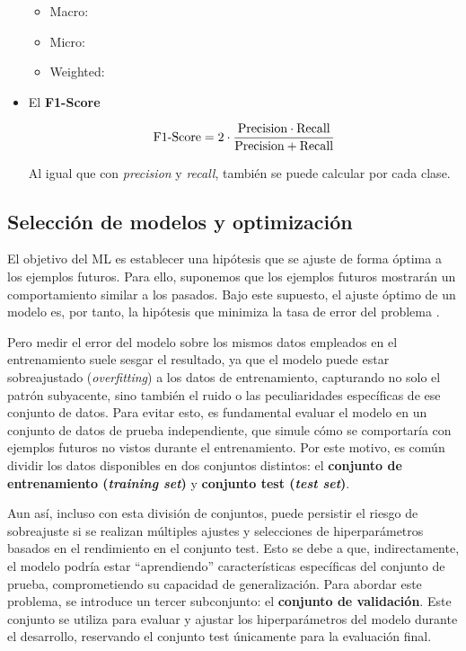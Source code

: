 \begin{itemize}
    \begin{itemize}
        \item Macro:
        \item Micro:
        \item Weighted: 
    \end{itemize}
    

    \item El \textbf{F1-Score} 

    $$
    \textnormal{F1-Score} = 2 \cdot \frac{\textnormal{Precision} \cdot \textnormal{Recall}}{\textnormal{Precision} + \textnormal{Recall}}
    $$

    Al igual que con \textit{precision} y \textit{recall}, también se puede calcular por cada clase. 


\end{itemize}


\subsection{Selección de modelos y optimización}

El objetivo del ML es establecer una hipótesis que se ajuste de forma óptima a los ejemplos futuros. Para 
ello, suponemos que los ejemplos futuros mostrarán un comportamiento similar a los pasados. Bajo este 
supuesto, el ajuste óptimo de un modelo es, por tanto, la hipótesis que minimiza la tasa de error del 
problema \cite{rusell2021}. 

Pero medir el error del modelo sobre los mismos datos empleados en el entrenamiento suele sesgar el resultado, 
ya que el modelo puede estar sobreajustado (\textit{overfitting}) a los datos de entrenamiento, capturando no 
solo el patrón subyacente, sino también el ruido o las peculiaridades específicas de ese conjunto de datos.
Para evitar esto, es fundamental evaluar el modelo en un conjunto de datos de prueba independiente, que simule 
cómo se comportaría con ejemplos futuros no vistos durante el entrenamiento. Por este motivo, es común dividir 
los datos disponibles en dos conjuntos distintos: el \textbf{conjunto de entrenamiento (\textit{training 
set})} y \textbf{conjunto test (\textit{test set})}.

Aun así, incluso con esta división de conjuntos, puede persistir el riesgo de sobreajuste si se realizan 
múltiples ajustes y selecciones de hiperparámetros basados en el rendimiento en el conjunto test.
Esto se debe a que, indirectamente, el modelo podría estar ``aprendiendo'' características específicas del 
conjunto de prueba, comprometiendo su capacidad de generalización. Para abordar este problema, se introduce 
un tercer subconjunto: el \textbf{conjunto de validación}. Este conjunto se utiliza para evaluar y ajustar 
los hiperparámetros del modelo durante el desarrollo, reservando el conjunto test únicamente para la 
evaluación final.

